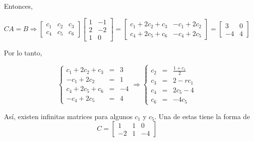 \begin{enumerate}[1.]
	Entonces,

	$$
	CA = B 
	\Rightarrow
	\left[\begin{array}{rrr}
	    c_1 & c_2 & c_3\\
	    c_4 & c_5 & c_6
	\end{array}\right]
	\left[\begin{array}{rr}
	    1  & -1 \\
	    2  & -2 \\
	    1  & 0
	\end{array}\right]
	=
	\left[\begin{array}{rr}
	    c_1+2c_2+c_3 & -c_1+2c_2\\
	    c_4+2c_5+c_6 & -c_4+2c_5
	\end{array}\right]
	=
	\left[\begin{array}{rr}
	    3 & 0\\
	    -4 & 4
	\end{array}\right]
	$$

	Por lo tanto,

	$$
	\left\{
	    \begin{array}{rcr}
		c_1+2c_2+c_3 &=& 3\\
		-c_1+2c_2 &=& 1\\
		c_4+2c_5+c_6 &=& -4\\
		-c_4+2c_5 &=& 4
	    \end{array}
	\right.
	\Rightarrow
	\left\{
	    \begin{array}{rcr}
		c_2 &=& \frac{1+c_1}{2}\\
		c_3 &=& 2-rc_1\\
		c_4 &=& 2c_5-4\\
		c_6 &=& -4c_5
	    \end{array}
	\right.
	$$

	Así, existen infinitas matrices para algunos $c_1$ y $c_5$. Una de estas tiene la forma de
	$$
	C = 
	\left[\begin{array}{rrr}
	    1 & 1 & 0\\
	    -2 & 1 & -4
	\end{array}\right]
	$$\\


\end{enumerate}
